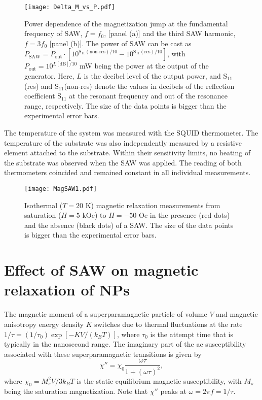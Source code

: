 \documentclass[aps,prb,floats,twocolumn]{revtex4}
\begin{document}
\begin{figure}[ht]
\begin{center}
\texttt{[image: Delta\_M\_vs\_P.pdf]}
\caption{Power dependence of the magnetization jump at the fundamental frequency of SAW, $f = f_0$, [panel (a)] and the third SAW harmonic, $f = 3f_0$ [panel (b)]. The power of SAW can be cast as $P_{\textrm{SAW}}=P_{\textrm{out}}\cdot\left[10^{\textrm{S}_{11}(\textrm{non-res})/10}-10^{\textrm{S}_{11}(\textrm{res})/10}\right]$, with $P_{\textrm{out}}=10^{L[\textrm{dB}]/10}$ mW being the power at the output of the generator. Here, $L$ is the decibel level of the output power, and S$_{11}$(res) and S$_{11}$(non-res) denote the values in decibels of the reflection coefficient S$_{11}$ at the resonant frequency and out of the resonance range, respectively. The size of the data points is bigger than the experimental error bars.}
\label{SAW}
\end{center}
\end{figure}
%

The temperature of the system was measured with the SQUID thermometer. The temperature of the substrate was also independently measured by a resistive element attached to the substrate. Within their sensitivity limits, no heating of the substrate was observed when the SAW was applied. The reading of both thermometers coincided and remained constant in all individual measurements.

\begin{figure}[ht]
\begin{center}
\texttt{[image: MagSAW1.pdf]}
\caption{ Isothermal ($T=20$ K) magnetic relaxation measurements from saturation ($H=5$ kOe) to $H=-50$ Oe in the presence (red dots) and the absence (black dots) of a SAW. The size of the data points is bigger than the experimental error bars.}
\label{MagSAW}
\end{center}
\end{figure}
%

\section{Effect of SAW on magnetic relaxation of NPs}\label{theory}
The magnetic moment of a superparamagnetic particle of volume $V$ and magnetic anisotropy energy density $K$ switches due to thermal fluctuations at the rate $1/{\tau} =  (1/\tau_0) \exp\left[-{KV}/(k_BT)\right]$, where $\tau_0$ is the attempt time that is typically in the nanosecond range. The imaginary part of the ac susceptibility associated with these superparamagnetic transitions is given by 
\begin{equation}\label{chi}
\chi'' = \chi_0\frac{\omega\tau}{1 + (\omega\tau)^2}, 
\end{equation}
where  $\chi_0 = {M_{s}^2V}/{3k_B T}$ is the static equilibrium magnetic susceptibility, with $M_{s}$ being the saturation magnetization. Note that $\chi''$ peaks at $\omega = 2\pi f = 1/\tau$.
\end{document}
